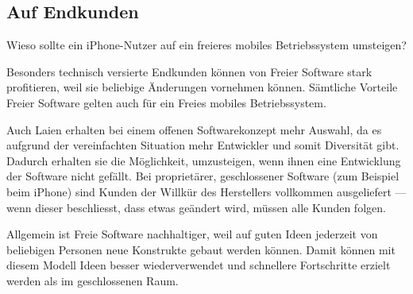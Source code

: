 \subsection{Auf Endkunden}
Wieso sollte ein iPhone-Nutzer auf ein freieres mobiles Betriebssystem umsteigen?

Besonders technisch versierte Endkunden können von Freier Software stark profitieren, weil sie beliebige Änderungen vornehmen können. Sämtliche Vorteile Freier Software gelten auch für ein Freies mobiles Betriebssystem.

Auch Laien erhalten bei einem offenen Softwarekonzept mehr Auswahl, da es aufgrund der vereinfachten Situation mehr Entwickler und somit Diversität gibt. Dadurch erhalten sie die Möglichkeit, umzusteigen, wenn ihnen eine Entwicklung der Software nicht gefällt. Bei proprietärer, geschlossener Software (zum Beispiel beim iPhone) sind Kunden der Willkür des Herstellers vollkommen ausgeliefert --- wenn dieser beschliesst, dass etwas geändert wird, müssen alle Kunden folgen.

Allgemein ist Freie Software nachhaltiger, weil auf guten Ideen jederzeit von beliebigen Personen neue Konstrukte gebaut werden können. Damit können mit diesem Modell Ideen besser wiederverwendet und schnellere Fortschritte erzielt werden als im geschlossenen Raum.